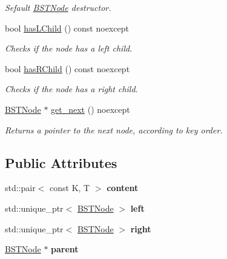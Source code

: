 \begin{DoxyCompactItemize}
\begin{DoxyCompactList}\small\item\em Sefault \hyperlink{class_node_namespace_1_1_b_s_t_node}{B\+S\+T\+Node} destructor. \end{DoxyCompactList}\item 
bool \hyperlink{class_node_namespace_1_1_b_s_t_node_ae6572b47848a90ccf24fffd98e965888}{has\+L\+Child} () const noexcept
\begin{DoxyCompactList}\small\item\em Checks if the node has a left child. \end{DoxyCompactList}\item 
bool \hyperlink{class_node_namespace_1_1_b_s_t_node_a8850198713eafcc7033271ecb023b3bf}{has\+R\+Child} () const noexcept
\begin{DoxyCompactList}\small\item\em Checks if the node has a right child. \end{DoxyCompactList}\item 
\hyperlink{class_node_namespace_1_1_b_s_t_node}{B\+S\+T\+Node} $\ast$ \hyperlink{class_node_namespace_1_1_b_s_t_node_a706ff01acdd424c760594da6fa0cb645}{get\+\_\+next} () noexcept
\begin{DoxyCompactList}\small\item\em Returns a pointer to the next node, according to key order. \end{DoxyCompactList}\end{DoxyCompactItemize}
\subsection*{Public Attributes}
\begin{DoxyCompactItemize}
\item 
\mbox{\label{class_node_namespace_1_1_b_s_t_node_a55b65280bcbe2668740e5240f6d11280}} 
std\+::pair$<$ const K, T $>$ {\bfseries content}
\item 
\mbox{\label{class_node_namespace_1_1_b_s_t_node_ab69b41269379fb89daa298a98bb4ff22}} 
std\+::unique\+\_\+ptr$<$ \hyperlink{class_node_namespace_1_1_b_s_t_node}{B\+S\+T\+Node} $>$ {\bfseries left}
\item 
\mbox{\label{class_node_namespace_1_1_b_s_t_node_a8c6eb700b07ad11d6398ff3e89f3b743}} 
std\+::unique\+\_\+ptr$<$ \hyperlink{class_node_namespace_1_1_b_s_t_node}{B\+S\+T\+Node} $>$ {\bfseries right}
\item 
\mbox{\label{class_node_namespace_1_1_b_s_t_node_ab7535b88780d30fda0c8a8664ba560f1}} 
\hyperlink{class_node_namespace_1_1_b_s_t_node}{B\+S\+T\+Node} $\ast$ {\bfseries parent}
\end{DoxyCompactItemize}


